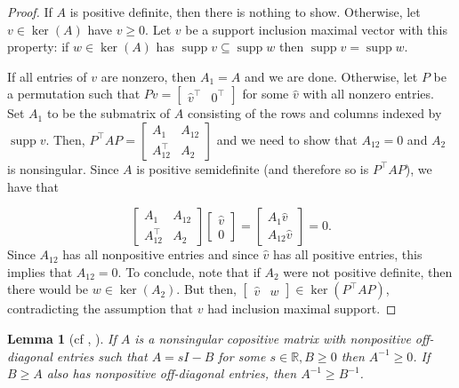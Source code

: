 \documentclass{amsart}
\DeclareMathOperator*{\supp}{supp}
\newcommand{\bbR}{\mathbb{R}}
\newtheorem{lemma}[theorem]{Lemma}
\theoremstyle{definition}
\begin{document}
\begin{proof}
If $A$ is positive definite, then there is nothing to show. Otherwise, let $v \in \ker(A)$ have $v \geq 0$. Let $v$ be a support inclusion maximal vector with this property: if $w \in \ker(A)$ has $\supp v \subseteq \supp w$ then $\supp v = \supp w$.  

If all entries of $v$ are nonzero, then $A_1 = A$ and we are done. Otherwise, let $P$ be a permutation such that $Pv = \begin{bmatrix} \hat{v}^\top & 0^\top \end{bmatrix}$ for some $\hat{v}$ with all nonzero entries. Set $A_1$ to be the submatrix of $A$ consisting of the rows and columns indexed by $\supp v$. Then, $P^\top A P = \begin{bmatrix} A_1 & A_{12}\\ A_{12}^\top & A_2\end{bmatrix}$ and we need to show that $A_{12} = 0$ and $A_{2}$ is nonsingular. Since $A$ is positive semidefinite (and therefore so is $P^\top A P$), we have that 

\[\begin{bmatrix} A_1 & A_{12}\\ A_{12}^\top & A_2\end{bmatrix}\begin{bmatrix} \hat{v} \\ 0 \end{bmatrix} = \begin{bmatrix} A_1 \hat{v}\\ A_{12}\hat{v}\end{bmatrix} = 0.\]
%
Since $A_{12}$ has all nonpositive entries and since $\hat{v}$ has all positive entries, this implies that $A_{12} = 0$. To conclude, note that if $A_2$ were not positive definite, then there would be $w \in \ker(A_2)$. But then, $\begin{bmatrix}\hat{v} & w \end{bmatrix} \in \ker(P^\top A P)$, contradicting the assumption that $v$ had inclusion maximal support. 
\end{proof}

\begin{lemma}[{cf \cite[Condition $N_{38}$]{berman_6_1994}, \cite[Lemma 2.9]{shaked-monderer_spn_2016}}]\label{lem:MmatrixInverses}
If $A$ is a nonsingular copositive matrix with nonpositive off-diagonal entries such that $A = sI - B$ for some $s\in \bbR, B\geq 0$ then $A^{-1}\geq 0$. If $B\geq A$ also has nonpositive off-diagonal entries, then $A^{-1} \geq B^{-1}$.
\end{lemma}
\end{document}
